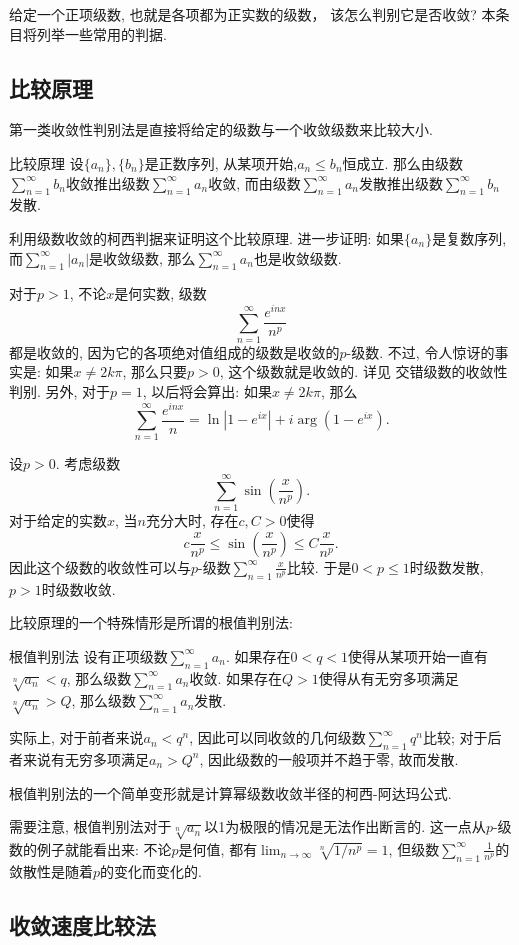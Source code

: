

给定一个正项级数, 也就是各项都为正实数的级数， 该怎么判别它是否收敛? 本条目将列举一些常用的判据.

\subsection{比较原理}

第一类收敛性判别法是直接将给定的级数与一个收敛级数来比较大小. 

\begin{theorem}{比较原理}
设$\{a_n\},\{b_n\}$是正数序列, 从某项开始,$a_n\leq b_n$恒成立. 那么由级数$\sum_{n=1}^\infty b_n$收敛推出级数$\sum_{n=1}^\infty a_n$收敛, 而由级数$\sum_{n=1}^\infty a_n$发散推出级数$\sum_{n=1}^\infty b_n$发散.
\end{theorem}
\begin{exercise}{}
利用级数收敛的柯西判据来证明这个比较原理. 进一步证明: 如果$\{a_n\}$是复数序列, 而$\sum_{n=1}^\infty|a_n|$是收敛级数, 那么$\sum_{n=1}^\infty a_n$也是收敛级数.
\end{exercise}

\begin{example}{}
对于$p>1$, 不论$x$是何实数, 级数
$$
\sum_{n=1}^\infty\frac{e^{inx}}{n^p}
$$
都是收敛的, 因为它的各项绝对值组成的级数是收敛的$p$-级数. 不过, 令人惊讶的事实是: 如果$x\neq 2k\pi$, 那么只要$p>0$, 这个级数就是收敛的. 详见 交错级数的收敛性判别. 另外, 对于$p=1$, 以后将会算出: 如果$x\neq 2k\pi$, 那么
$$
\sum_{n=1}^\infty\frac{e^{inx}}{n}=\ln|1-e^{ix}|+i\arg(1-e^{ix}).
$$
\end{example}

\begin{example}{}
设$p>0$. 考虑级数
$$
\sum_{n=1}^\infty\sin\left(\frac{x}{n^p}\right).
$$
对于给定的实数$x$, 当$n$充分大时, 存在$c,C>0$使得
$$
c\frac{x}{n^p}\leq\sin\left(\frac{x}{n^p}\right)\leq C\frac{x}{n^p}.
$$
因此这个级数的收敛性可以与$p$-级数$\sum_{n=1}^\infty\frac{x}{n^p}$比较. 于是$0<p\leq1$时级数发散, $p>1$时级数收敛.
\end{example}

比较原理的一个特殊情形是所谓的根值判别法:

\begin{theorem}{根值判别法}
设有正项级数$\sum_{n=1}^\infty a_n$. 如果存在$0<q<1$使得从某项开始一直有$\sqrt[n]{a_n}<q$, 那么级数$\sum_{n=1}^\infty a_n$收敛. 如果存在$Q>1$使得从有无穷多项满足$\sqrt[n]{a_n}>Q$, 那么级数$\sum_{n=1}^\infty a_n$发散.
\end{theorem}
实际上, 对于前者来说$a_n<q^n$, 因此可以同收敛的几何级数$\sum_{n=1}^\infty q^n$比较; 对于后者来说有无穷多项满足$a_n>Q^n$, 因此级数的一般项并不趋于零, 故而发散.

根值判别法的一个简单变形就是计算幂级数收敛半径的柯西-阿达玛公式.

需要注意, 根值判别法对于$\sqrt[n]{a_n}$以1为极限的情况是无法作出断言的. 这一点从$p$-级数的例子就能看出来: 不论$p$是何值, 都有$\lim_{n\to\infty}\sqrt[n]{1/n^p}=1$, 但级数$\sum_{n=1}^\infty\frac{1}{n^p}$的敛散性是随着$p$的变化而变化的.

\subsection{收敛速度比较法}